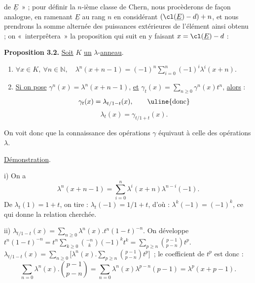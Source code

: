 
de \(\underline{E}\)~» ;
pour définir la \(n\)-ième classe de Chern, nous procèderons de façon analogue, en ramenant \(\underline{E}\) au rang \(n\) en considérant \((\cl(\underline{E})-d)+n\), et nous prendrons la somme alternée des puissances extérieures de l'élément ainsi obtenu ; on «~interprêtera~» la proposition qui suit en y faisant \(x=\cl(\underline{E})-d\) :

\textbf{Proposition 3.2.} \uline{Soit} \(K\) \uline{un} \(\lambda\)-\uline{anneau}.
\begin{enumerate}[label=\roman*)]
\item \(\forall x\in K,\ \forall n\in\mathbb N,\quad \lambda^n(x+n-1)=(-1)^n\sum_{i=0}^n(-1)^i\lambda^i(x+n).\)
\item \uline{Si on pose} \(\gamma^n(x)=\lambda^n(x+n-1)\), \uline{et} \(\gamma_t(x)=\sum_{n\ge0}\gamma^n(x)t^n\), \uline{alors} :
\[
  \gamma_t(x)=\lambda_{t/1-t}(x),\qquad\text{\uline{donc}}
\]
\[
  \lambda_t(x)=\gamma_{t/1+t}(x).
\]
\end{enumerate}

On voit donc que la connaissance des opérations \(\gamma\) équivaut à celle des opérations \(\lambda\).

\uline{Démonstration}.

i) On a
\[
  \lambda^n(x+n-1)=\sum_{i=0}^{n}\lambda^i(x+n)\lambda^{n-i}(-1).
\]
De \(\lambda_t(1)=1+t\), on tire : \(\lambda_t(-1)=1/1+t\), d'où : \(\lambda^k(-1)=(-1)^k\), ce qui donne la relation cherchée.

ii) \(\lambda_{t/1-t}(x)=\sum_{n\ge0}\lambda^n(x).t^n(1-t)^{-n}.\)
On développe \(t^n(1-t)^{-n}=t^n\sum_{k\ge0}\binom{-n}{k}(-1)^kt^k=\sum_{p\ge n}\binom{p-1}{p-n}t^p\). \(\lambda_{t/1-t}(x)=\sum_{n\ge0}\bigl[\lambda^n(x).\sum_{p\ge n}\binom{p-1}{p-n}t^p\bigr]\)~; le coefficient de \(t^p\) est donc :
\[
  \sum_{n=0}\lambda^n(x).\binom{p-1}{p-n}
  =\sum_{n=0}\lambda^n(x)\lambda^{p-n}(p-1)
  =\lambda^p(x+p-1).
\]

